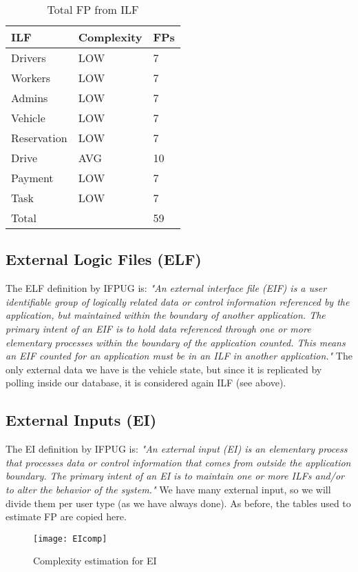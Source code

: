 \begin{table}
  \centering
    \begin{tabular}{| l | l | l |}
    \hline
    \textbf{ILF} & \textbf{Complexity} & \textbf{FPs} \\ \hline
    Drivers & LOW & 7 \\ \hline
    Workers & LOW & 7\\ \hline
    Admins & LOW & 7\\ \hline
    Vehicle & LOW & 7\\ \hline
    Reservation & LOW & 7\\ \hline
    Drive & AVG & 10\\ \hline
    Payment & LOW & 7\\ \hline
    Task & LOW & 7\\ \hline 
    \hline
    \multicolumn{2}{|l|}{Total} & 59 \\ \hline
    \end{tabular}
  \caption{Total FP from ILF}
\end{table}



\subsection{External Logic Files (ELF)}
The ELF definition by IFPUG is: \bigbreak
\textit{"An external interface file (EIF) is a user identifiable group of logically related data or control information referenced by the application, but maintained within the boundary of another application. The primary intent of an EIF is to hold data referenced through one or more elementary processes within the boundary of the application counted. This means an EIF counted for an application must be in an ILF in another application."}
\bigbreak
The only external data we have is the vehicle state, but since it is replicated by polling inside our database, it is considered again ILF (see above). 

\subsection{External Inputs (EI)}
The EI definition by IFPUG is: \bigbreak
\textit{"An external input (EI) is an elementary process that processes data or control information that comes from outside the application boundary. The primary intent of an EI is to maintain one or more ILFs and/or to alter the behavior of the system."}
\bigbreak
We have many external input, so we will divide them per user type (as we have always done). As before, the tables used to estimate FP are copied here.
\begin{figure}
  \centering
  \texttt{[image: EIcomp]}
  \caption{Complexity estimation for EI}
\end{figure}

